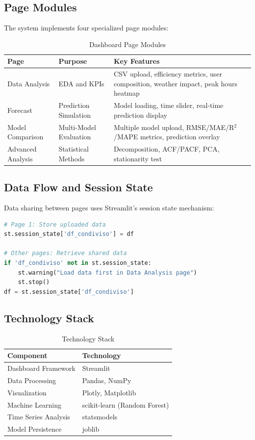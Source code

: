 \documentclass[12pt,a4paper]{article}
\begin{document}
\subsection{Page Modules}

The system implements four specialized page modules:

\begin{table}[H]
\centering
\caption{Dashboard Page Modules}
\begin{tabular}{llp{6cm}}
\toprule
\textbf{Page} & \textbf{Purpose} & \textbf{Key Features} \\
\midrule
Data Analysis & EDA and KPIs & CSV upload, efficiency metrics, user composition, weather impact, peak hours heatmap \\
Forecast & Prediction Simulation & Model loading, time slider, real-time prediction display \\
Model Comparison & Multi-Model Evaluation & Multiple model upload, RMSE/MAE/R$^2$/MAPE metrics, prediction overlay \\
Advanced Analysis & Statistical Methods & Decomposition, ACF/PACF, PCA, stationarity test \\
\bottomrule
\end{tabular}
\label{tab:pages}
\end{table}

\subsection{Data Flow and Session State}

Data sharing between pages uses Streamlit's session state mechanism:

\begin{lstlisting}[language=Python, caption=Session State Data Sharing]
# Page 1: Store uploaded data
st.session_state['df_condiviso'] = df

# Other pages: Retrieve shared data
if 'df_condiviso' not in st.session_state:
    st.warning("Load data first in Data Analysis page")
    st.stop()
df = st.session_state['df_condiviso']
\end{lstlisting}

\subsection{Technology Stack}

\begin{table}[H]
\centering
\caption{Technology Stack}
\begin{tabular}{ll}
\toprule
\textbf{Component} & \textbf{Technology} \\
\midrule
Dashboard Framework & Streamlit \\
Data Processing & Pandas, NumPy \\
Visualization & Plotly, Matplotlib \\
Machine Learning & scikit-learn (Random Forest) \\
Time Series Analysis & statsmodels \\
Model Persistence & joblib \\
\bottomrule
\end{tabular}
\label{tab:tech}
\end{table}
\end{document}
